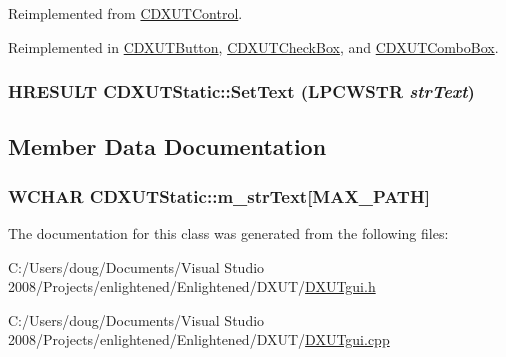 Reimplemented from \hyperlink{class_c_d_x_u_t_control_afd92fa04241f66fdbf207bc5870c9388}{CDXUTControl}.

Reimplemented in \hyperlink{class_c_d_x_u_t_button_a75a837a8eca0777b51d3aac6de6d6144}{CDXUTButton}, \hyperlink{class_c_d_x_u_t_check_box_a518c5e4d5250b1c0be83bf456c43f8b8}{CDXUTCheckBox}, and \hyperlink{class_c_d_x_u_t_combo_box_affcd25fdf9baf53e39e7b50e58ee05d4}{CDXUTComboBox}.\hypertarget{class_c_d_x_u_t_static_ac5dd2c6b2a9da5eeb57ad377286ac568}{
\subsubsection[{SetText}]{\setlength{\rightskip}{0pt plus 5cm}HRESULT CDXUTStatic::SetText (LPCWSTR {\em strText})}}
\label{class_c_d_x_u_t_static_ac5dd2c6b2a9da5eeb57ad377286ac568}


\subsection{Member Data Documentation}
\hypertarget{class_c_d_x_u_t_static_a196a0036e5d50df0986db5537c9e05d4}{
\subsubsection[{m\_\-strText}]{\setlength{\rightskip}{0pt plus 5cm}WCHAR {\bf CDXUTStatic::m\_\-strText}\mbox{[}MAX\_\-PATH\mbox{]}}}
\label{class_c_d_x_u_t_static_a196a0036e5d50df0986db5537c9e05d4}


The documentation for this class was generated from the following files:\begin{DoxyCompactItemize}
\item 
C:/Users/doug/Documents/Visual Studio 2008/Projects/enlightened/Enlightened/DXUT/\hyperlink{_d_x_u_tgui_8h}{DXUTgui.h}\item 
C:/Users/doug/Documents/Visual Studio 2008/Projects/enlightened/Enlightened/DXUT/\hyperlink{_d_x_u_tgui_8cpp}{DXUTgui.cpp}\end{DoxyCompactItemize}
